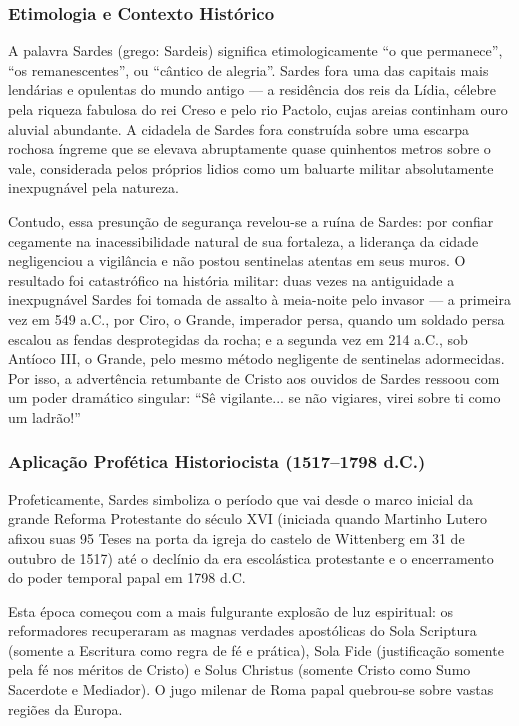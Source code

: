 \documentclass[11pt,a4paper,openany]{book}
\begin{document}
\subsubsection*{Etimologia e Contexto Histórico}
A palavra Sardes (grego: Sardeis) significa etimologicamente ``o que permanece'', ``os remanescentes'', ou ``cântico de alegria''. Sardes fora uma das capitais mais lendárias e opulentas do mundo antigo — a residência dos reis da Lídia, célebre pela riqueza fabulosa do rei Creso e pelo rio Pactolo, cujas areias continham ouro aluvial abundante. A cidadela de Sardes fora construída sobre uma escarpa rochosa íngreme que se elevava abruptamente quase quinhentos metros sobre o vale, considerada pelos próprios lidios como um baluarte militar absolutamente inexpugnável pela natureza.

Contudo, essa presunção de segurança revelou-se a ruína de Sardes: por confiar cegamente na inacessibilidade natural de sua fortaleza, a liderança da cidade negligenciou a vigilância e não postou sentinelas atentas em seus muros. O resultado foi catastrófico na história militar: duas vezes na antiguidade a inexpugnável Sardes foi tomada de assalto à meia-noite pelo invasor — a primeira vez em 549 a.C., por Ciro, o Grande, imperador persa, quando um soldado persa escalou as fendas desprotegidas da rocha; e a segunda vez em 214 a.C., sob Antíoco III, o Grande, pelo mesmo método negligente de sentinelas adormecidas. Por isso, a advertência retumbante de Cristo aos ouvidos de Sardes ressoou com um poder dramático singular: ``Sê vigilante... se não vigiares, virei sobre ti como um ladrão!''


\subsubsection*{Aplicação Profética Historiocista (1517–1798 d.C.)}
Profeticamente, Sardes simboliza o período que vai desde o marco inicial da grande Reforma Protestante do século XVI (iniciada quando Martinho Lutero afixou suas 95 Teses na porta da igreja do castelo de Wittenberg em 31 de outubro de 1517) até o declínio da era escolástica protestante e o encerramento do poder temporal papal em 1798 d.C.

Esta época começou com a mais fulgurante explosão de luz espiritual: os reformadores recuperaram as magnas verdades apostólicas do Sola Scriptura (somente a Escritura como regra de fé e prática), Sola Fide (justificação somente pela fé nos méritos de Cristo) e Solus Christus (somente Cristo como Sumo Sacerdote e Mediador). O jugo milenar de Roma papal quebrou-se sobre vastas regiões da Europa.
\end{document}
